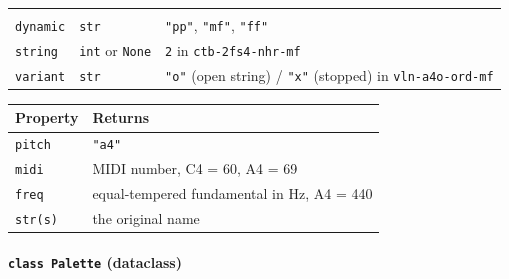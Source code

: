 \documentclass[
  10pt,
]{article}
\begin{document}
\begin{longtable}[]{@{}lll@{}}
\begin{minipage}[t]{0.30\columnwidth}
\end{minipage}\tabularnewline
\begin{minipage}[t]{0.30\columnwidth}\raggedright
\texttt{dynamic}\strut
\end{minipage} &
\begin{minipage}[t]{0.30\columnwidth}\raggedright
\texttt{str}\strut
\end{minipage} &
\begin{minipage}[t]{0.30\columnwidth}\raggedright
\texttt{"pp"}, \texttt{"mf"}, \texttt{"ff"}\strut
\end{minipage}\tabularnewline
\begin{minipage}[t]{0.30\columnwidth}\raggedright
\texttt{string}\strut
\end{minipage} &
\begin{minipage}[t]{0.30\columnwidth}\raggedright
\texttt{int} or \texttt{None}\strut
\end{minipage} &
\begin{minipage}[t]{0.30\columnwidth}\raggedright
\texttt{2} in \texttt{ctb-2fs4-nhr-mf}\strut
\end{minipage}\tabularnewline
\begin{minipage}[t]{0.30\columnwidth}\raggedright
\texttt{variant}\strut
\end{minipage} &
\begin{minipage}[t]{0.30\columnwidth}\raggedright
\texttt{str}\strut
\end{minipage} &
\begin{minipage}[t]{0.30\columnwidth}\raggedright
\texttt{"o"} (open string) / \texttt{"x"} (stopped) in
\texttt{vln-a4o-ord-mf}\strut
\end{minipage}\tabularnewline
\bottomrule
\end{longtable}

\begin{longtable}[]{@{}ll@{}}
\toprule
Property & Returns\tabularnewline
\midrule
\endhead
\texttt{pitch} & \texttt{"a4"}\tabularnewline
\texttt{midi} & MIDI number, C4 = 60, A4 = 69\tabularnewline
\texttt{freq} & equal-tempered fundamental in Hz, A4 =
440\tabularnewline
\texttt{str(s)} & the original name\tabularnewline
\bottomrule
\end{longtable}

\paragraph{\texorpdfstring{\texttt{class\ Palette}
(dataclass)}{class Palette (dataclass)}}
\end{document}
